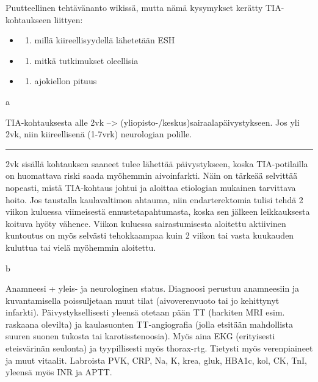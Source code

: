 \documentclass[
]{book}
\providecommand{\tightlist}{%
  \setlength{\itemsep}{0pt}\setlength{\parskip}{0pt}}
\begin{document}
Puutteellinen tehtävänanto wikissä, mutta nämä kysymykset kerätty TIA-kohtaukseen liittyen:

\begin{itemize}
\tightlist
\item
  \begin{enumerate}
  \def\labelenumi{\alph{enumi}.}
  \tightlist
  \item
    millä kiireellisyydellä lähetetään ESH
  \end{enumerate}
\item
  \begin{enumerate}
  \def\labelenumi{\alph{enumi}.}
  \setcounter{enumi}{1}
  \tightlist
  \item
    mitkä tutkimukset oleellisia
  \end{enumerate}
\item
  \begin{enumerate}
  \def\labelenumi{\alph{enumi}.}
  \setcounter{enumi}{2}
  \tightlist
  \item
    ajokiellon pituus
  \end{enumerate}
\end{itemize}

a

TIA-kohtauksesta alle 2vk --\textgreater{} (yliopisto-/keskus)sairaalapäivystykseen. Jos yli 2vk, niin kiireellisenä (1-7vrk) neurologian polille.

\begin{center}\rule{0.5\linewidth}{0.5pt}\end{center}

2vk sisällä kohtauksen saaneet tulee lähettää päivystykseen, koska TIA-potilailla on huomattava riski saada myöhemmin aivoinfarkti. Näin on tärkeää selvittää nopeasti, mistä TIA-kohtaus johtui ja aloittaa etiologian mukainen tarvittava hoito. Jos taustalla kaulavaltimon ahtauma, niin endarterektomia tulisi tehdä 2 viikon kuluessa viimeisestä ennustetapahtumasta, koska sen jälkeen leikkauksesta koituva hyöty vähenee. Viikon kuluessa sairastumisesta aloitettu aktiivinen kuntoutus on myös selvästi tehokkaampaa kuin 2 viikon tai vasta kuukauden kuluttua tai vielä myöhemmin aloitettu.

b

Anamneesi + yleis- ja neurologinen status. Diagnoosi perustuu anamneesiin ja kuvantamisella poissuljetaan muut tilat (aivoverenvuoto tai jo kehittynyt infarkti). Päivystyksellisesti yleensä otetaan pään TT (harkiten MRI esim. raskaana olevilta) ja kaulasuonten TT-angiografia (jolla etsitään mahdollista suuren suonen tukosta tai karotisstenoosia). Myös aina EKG (erityisesti eteisvärinän seulonta) ja tyypillisesti myös thorax-rtg. Tietysti myös verenpiaineet ja muut vitaalit. Labroista PVK, CRP, Na, K, krea, gluk, HBA1c, kol, CK, TnI, yleensä myös INR ja APTT.
\end{document}
